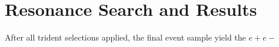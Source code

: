 \chapter{Resonance Search and Results}

After all trident selections applied, the final event sample yield the $e+e-$


